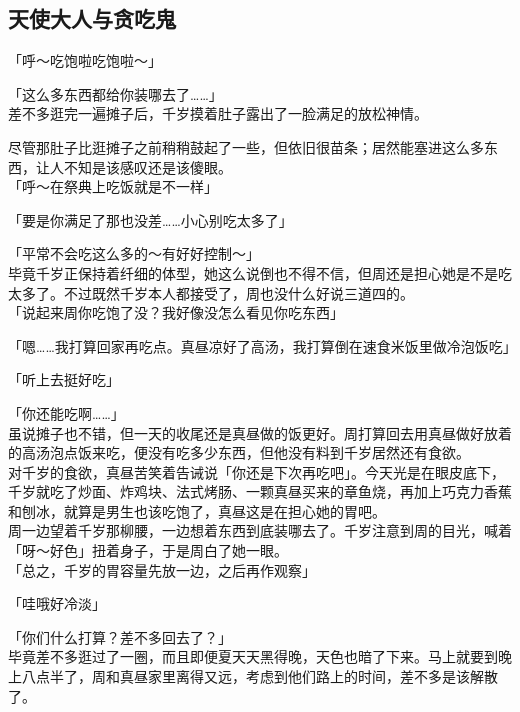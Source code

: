 \subsection{天使大人与贪吃鬼}

「呼～吃饱啦吃饱啦～」

「这么多东西都给你装哪去了……」\\

差不多逛完一遍摊子后，千岁摸着肚子露出了一脸满足的放松神情。

尽管那肚子比逛摊子之前稍稍鼓起了一些，但依旧很苗条；居然能塞进这么多东西，让人不知是该感叹还是该傻眼。\\

「呼～在祭典上吃饭就是不一样」

「要是你满足了那也没差……小心别吃太多了」

「平常不会吃这么多的～有好好控制～」\\

毕竟千岁正保持着纤细的体型，她这么说倒也不得不信，但周还是担心她是不是吃太多了。不过既然千岁本人都接受了，周也没什么好说三道四的。\\

「说起来周你吃饱了没？我好像没怎么看见你吃东西」

「嗯……我打算回家再吃点。真昼凉好了高汤，我打算倒在速食米饭里做冷泡饭吃」

「听上去挺好吃」

「你还能吃啊……」\\

虽说摊子也不错，但一天的收尾还是真昼做的饭更好。周打算回去用真昼做好放着的高汤泡点饭来吃，便没有吃多少东西，但他没有料到千岁居然还有食欲。\\

对千岁的食欲，真昼苦笑着告诫说「你还是下次再吃吧」。今天光是在眼皮底下，千岁就吃了炒面、炸鸡块、法式烤肠、一颗真昼买来的章鱼烧，再加上巧克力香蕉和刨冰，就算是男生也该吃饱了，真昼这是在担心她的胃吧。\\

周一边望着千岁那柳腰，一边想着东西到底装哪去了。千岁注意到周的目光，喊着「呀～好色」扭着身子，于是周白了她一眼。\\

「总之，千岁的胃容量先放一边，之后再作观察」

「哇哦好冷淡」

「你们什么打算？差不多回去了？」\\

毕竟差不多逛过了一圈，而且即便夏天天黑得晚，天色也暗了下来。马上就要到晚上八点半了，周和真昼家里离得又远，考虑到他们路上的时间，差不多是该解散了。

